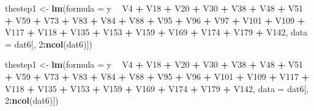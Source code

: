 \documentclass[
]{article}
\newenvironment{Shaded}{\begin{snugshade}}{\end{snugshade}}
\newcommand{\DataTypeTok}[1]{\textcolor[rgb]{0.13,0.29,0.53}{#1}}
\newcommand{\DecValTok}[1]{\textcolor[rgb]{0.00,0.00,0.81}{#1}}
\newcommand{\KeywordTok}[1]{\textcolor[rgb]{0.13,0.29,0.53}{\textbf{#1}}}
\newcommand{\NormalTok}[1]{#1}
\newcommand{\OperatorTok}[1]{\textcolor[rgb]{0.81,0.36,0.00}{\textbf{#1}}}
\newcommand{\StringTok}[1]{\textcolor[rgb]{0.31,0.60,0.02}{#1}}
\begin{document}
\begin{Shaded}
\begin{Highlighting}[]
\NormalTok{thestep1 <-}\StringTok{ }\KeywordTok{lm}\NormalTok{(}\DataTypeTok{formula =}\NormalTok{ y }\OperatorTok{~}\StringTok{ }\NormalTok{V4 }\OperatorTok{+}\StringTok{ }\NormalTok{V18 }\OperatorTok{+}\StringTok{ }\NormalTok{V20 }\OperatorTok{+}\StringTok{ }\NormalTok{V30 }\OperatorTok{+}\StringTok{ }\NormalTok{V38 }\OperatorTok{+}\StringTok{ }\NormalTok{V48 }\OperatorTok{+}\StringTok{ }\NormalTok{V51 }\OperatorTok{+}\StringTok{ }
\StringTok{    }\NormalTok{V59 }\OperatorTok{+}\StringTok{ }\NormalTok{V73 }\OperatorTok{+}\StringTok{ }\NormalTok{V83 }\OperatorTok{+}\StringTok{ }\NormalTok{V84 }\OperatorTok{+}\StringTok{ }\NormalTok{V88 }\OperatorTok{+}\StringTok{ }\NormalTok{V95 }\OperatorTok{+}\StringTok{ }\NormalTok{V96 }\OperatorTok{+}\StringTok{ }\NormalTok{V97 }\OperatorTok{+}\StringTok{ }\NormalTok{V101 }\OperatorTok{+}\StringTok{ }\NormalTok{V109 }\OperatorTok{+}\StringTok{ }
\StringTok{    }\NormalTok{V117 }\OperatorTok{+}\StringTok{ }\NormalTok{V118 }\OperatorTok{+}\StringTok{ }\NormalTok{V135 }\OperatorTok{+}\StringTok{ }\NormalTok{V153 }\OperatorTok{+}\StringTok{ }\NormalTok{V159 }\OperatorTok{+}\StringTok{ }\NormalTok{V169 }\OperatorTok{+}\StringTok{ }
\StringTok{    }\NormalTok{V174 }\OperatorTok{+}\StringTok{ }\NormalTok{V179 }\OperatorTok{+}\StringTok{ }\NormalTok{V142, }\DataTypeTok{data =}\NormalTok{ dat6[, }\DecValTok{2}\OperatorTok{:}\KeywordTok{ncol}\NormalTok{(dat6)])}

\NormalTok{thestep1 <-}\StringTok{ }\KeywordTok{lm}\NormalTok{(}\DataTypeTok{formula =}\NormalTok{ y }\OperatorTok{~}\StringTok{ }\NormalTok{V4 }\OperatorTok{+}\StringTok{ }\NormalTok{V18 }\OperatorTok{+}\StringTok{ }\NormalTok{V20 }\OperatorTok{+}\StringTok{ }\NormalTok{V30 }\OperatorTok{+}\StringTok{ }\NormalTok{V38 }\OperatorTok{+}\StringTok{ }\NormalTok{V48 }\OperatorTok{+}\StringTok{ }\NormalTok{V51 }\OperatorTok{+}\StringTok{ }
\StringTok{    }\NormalTok{V59 }\OperatorTok{+}\StringTok{ }\NormalTok{V73 }\OperatorTok{+}\StringTok{ }\NormalTok{V83 }\OperatorTok{+}\StringTok{ }\NormalTok{V84 }\OperatorTok{+}\StringTok{ }\NormalTok{V88 }\OperatorTok{+}\StringTok{ }\NormalTok{V95 }\OperatorTok{+}\StringTok{ }\NormalTok{V96 }\OperatorTok{+}\StringTok{ }\NormalTok{V101 }\OperatorTok{+}\StringTok{ }\NormalTok{V109 }\OperatorTok{+}\StringTok{ }
\StringTok{    }\NormalTok{V117 }\OperatorTok{+}\StringTok{ }\NormalTok{V118 }\OperatorTok{+}\StringTok{ }\NormalTok{V135 }\OperatorTok{+}\StringTok{ }\NormalTok{V153 }\OperatorTok{+}\StringTok{ }\NormalTok{V159 }\OperatorTok{+}\StringTok{ }\NormalTok{V169 }\OperatorTok{+}\StringTok{ }
\StringTok{    }\NormalTok{V174 }\OperatorTok{+}\StringTok{ }\NormalTok{V179 }\OperatorTok{+}\StringTok{ }\NormalTok{V142, }\DataTypeTok{data =}\NormalTok{ dat6[, }\DecValTok{2}\OperatorTok{:}\KeywordTok{ncol}\NormalTok{(dat6)])}


\end{Highlighting}
\end{Shaded}
\end{document}
